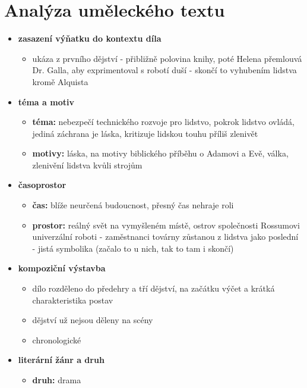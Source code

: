 \documentclass[11pt]{article}
\begin{document}
    \section*{Analýza uměleckého textu}
    \begin{itemize}
        \item\textbf{zasazení výňatku do kontextu díla}
        \begin{itemize}
            \item ukáza z prvního dějství - přibližně polovina knihy, poté Helena přemlouvá Dr. Galla, aby exprimentoval s robotí duší - skončí to vyhubením lidstva kromě Alquista
        \end{itemize}
        \item\textbf{téma a motiv}
        \begin{itemize}
            \item\textbf{téma: }nebezpečí technického rozvoje pro lidstvo, pokrok lidstvo ovládá, jediná záchrana je láska, kritizuje lidskou touhu příliš zlenivět
            \item\textbf{motivy: }láska, na motivy biblického příběhu o Adamovi a Evě, válka, zlenivění lidstva kvůli strojům
        \end{itemize}
        \item\textbf{časoprostor}
        \begin{itemize}
            \item\textbf{čas: }blíže neurčená budoucnost, přesný čas nehraje roli
            \item\textbf{prostor: }reálný svět na vymyšleném místě, ostrov společnosti Rossumovi univerzální roboti - zaměstnanci továrny zůstanou z lidstva jako poslední - jistá symbolika (začalo to u nich, tak to tam i skončí)
        \end{itemize}
        \item\textbf{kompoziční výstavba}
        \begin{itemize}
            \item dílo rozděleno do předehry a tří dějství, na začátku výčet a krátká charakteristika postav
            \item dějství už nejsou děleny na scény
            \item chronologické
        \end{itemize}
        \item\textbf{literární žánr a druh}
        \begin{itemize}
            \item\textbf{druh: }drama

\end{itemize}
\end{itemize}
\end{document}
